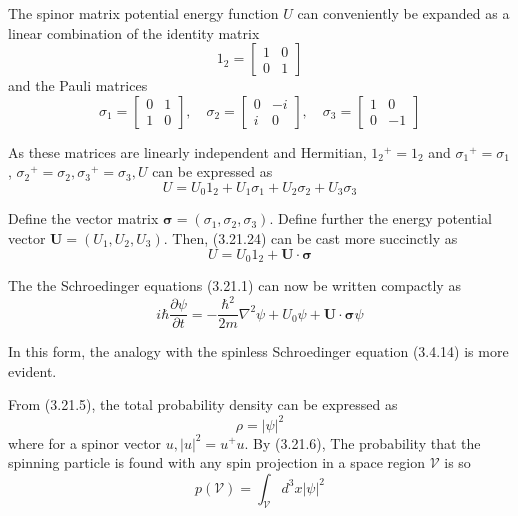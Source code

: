 \documentclass{article}
\begin{document}
The spinor matrix potential energy function $U$ can conveniently be expanded
as a linear combination of the identity matrix
$$
1_{2}=\left[\begin{array}{ll}
1 & 0  \tag{3.21.22}\\
0 & 1
\end{array}\right]
$$
and the Pauli matrices
$$
\sigma_{1}=\left[\begin{array}{ll}
0 & 1  \tag{3.21.23}\\
1 & 0
\end{array}\right], \quad \sigma_{2}=\left[\begin{array}{rr}
0 & -i \\
i & 0
\end{array}\right], \quad \sigma_{3}=\left[\begin{array}{rr}
1 & 0 \\
0 & -1
\end{array}\right]
$$

As these matrices are linearly independent and Hermitian, $1_{2}{ }^{+}=1_{2}$ and $\sigma_{1}{ }^{+}=\sigma_{1}$, $\sigma_{2}{ }^{+}=\sigma_{2}, \sigma_{3}{ }^{+}=\sigma_{3}, U$ can be expressed as
$$
\begin{equation*}
U=U_{0} 1_{2}+U_{1} \sigma_{1}+U_{2} \sigma_{2}+U_{3} \sigma_{3} \tag{3.21.24}
\end{equation*}
$$

Define the vector matrix $\boldsymbol{\sigma}=\left(\sigma_{1}, \sigma_{2}, \sigma_{3}\right)$. Define further the energy potential vector $\boldsymbol{U}=\left(U_{1}, U_{2}, U_{3}\right)$. Then, (3.21.24) can be cast more succinctly as
$$
\begin{equation*}
U=U_{0} 1_{2}+\boldsymbol{U} \cdot \boldsymbol{\sigma} \tag{3.21.25}
\end{equation*}
$$

The the Schroedinger equations (3.21.1) can now be written compactly as
$$
\begin{equation*}
i \hbar \frac{\partial \psi}{\partial t}=-\frac{\hbar^{2}}{2 m} \nabla^{2} \psi+U_{0} \psi+\boldsymbol{U} \cdot \boldsymbol{\sigma} \psi \tag{3.21.26}
\end{equation*}
$$

In this form, the analogy with the spinless Schroedinger equation (3.4.14) is more evident.

From (3.21.5), the total probability density can be expressed as
$$
\begin{equation*}
\rho=|\psi|^{2} \tag{3.21.27}
\end{equation*}
$$
where for a spinor vector $u,|u|^{2}=u^{+} u$. By (3.21.6), The probability that the spinning particle is found with any spin projection in a space region $\mathcal{V}$ is so
$$
\begin{equation*}
p(\mathcal{V})=\int_{\mathcal{V}} d^{3} x|\psi|^{2} \tag{3.21.28}
\end{equation*}
$$
\end{document}
